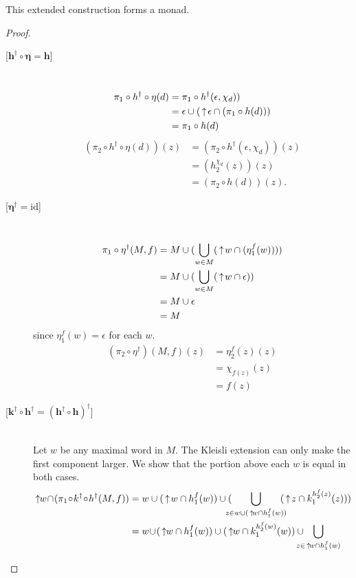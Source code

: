 \begin{theorem}
This extended construction forms a monad.
\end{theorem}
\begin{proof}
\begin{description}
\item[{[}$\boldsymbol{h^\dagger\circ \eta = h}${]}] \hfill \\
\begin{align*}
\pi_1\circ h^\dagger\circ\eta(d) &= \pi_1\circ h^\dagger(\epsilon, \chi_d)) \\
&= \epsilon \cup (\,\uparrow\! \epsilon \cap (\pi_1 \circ h(d))) \\
&= \pi_1 \circ h(d)
\end{align*}
\begin{align*}
(\pi_2\circ h^\dagger\circ\eta (d))(z) &= (\pi_2\circ h^\dagger(\epsilon, \chi_d))(z) \\
&= (h_2^{\chi_d}(z))(z) \\
&= (\pi_2\circ h(d))(z).
\end{align*}
\item[{[}$\boldsymbol{\eta^\dagger = \mathrm{id}}${]}] \hfill \\
\begin{align*}
\pi_1\circ\eta^\dagger(M,f) &= 
M \cup (\bigcup_{w\in M} (\,\uparrow\! w \cap (\eta_{1}^{f}(w)))) \\
&= M\cup (\bigcup_{w\in M} (\,\uparrow\! w \cap \epsilon)) \\
&= M \cup \epsilon \\
&= M
\end{align*}
since $\eta_1^f(w) = \epsilon$ for each $w$.
\begin{align*}
(\pi_2\circ \eta^\dagger)(M, f)(z) &= \eta_2^f(z)(z) \\
&= \chi_{f(z)}(z) \\
&= f(z)
\end{align*}
\item[{[}$\boldsymbol{k^\dagger\circ h^\dagger = (h^\dagger\circ h)^\dagger}${]}] \hfill \\
Let $w$ be any maximal word in $M$.  The Kleisli extension can only make the first component larger.  We show that the portion above each $w$ is equal in both cases.
\begin{align*}
\ua\! w\!\cap\! (\pi_1\!\circ\! k^\dagger\!\circ\! h^\dagger (M,f)) 
&= w \cup (\ua w \cap h^{f}_{1}(w))\cup (\!\!\!\!\bigcup_{z\in w\cup (\ua w \cap h^{f}_{1}(w))}\!\!\!\! 
(\ua z \cap k_{1}^{h_{2}^{f}(z)}(z))) \\
&= w\! \cup\! (\ua\! w \cap h^{f}_{1}(w))\cup (\ua\! w \cap k_{1}^{h_{2}^{f}(w)}(w))\cup\!\!\!\!\!\!\bigcup_{z\in \ua w \cap h^{f}_{1}(w)}\!\!\!\!\!\! 

\end{align*}
\end{description}
\end{proof}
